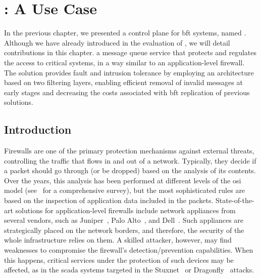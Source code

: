 \chapter{\sieveq: A Use Case}
\label{chap:sieveq}

In the previous chapter, we presented a control plane for \gls{bft} systems, named \system. 
Although we have already introduced \sieveq in the evaluation of \system, we will detail \sieveq contributions in this chapter.
\sieveq a message queue service that protects and regulates the access to critical systems, in a way similar to an application-level firewall.
The solution provides fault and intrusion tolerance by employing an architecture based on two filtering layers, enabling efficient removal of invalid messages at early stages and decreasing the costs associated with \gls{bft} replication of previous solutions.


\section{Introduction}

Firewalls are one of the primary protection mechanisms against external threats, controlling the traffic that flows in and out of a network. 
Typically, they decide if a packet should go through (or be dropped) based on the analysis of its contents. 
Over the years, this analysis has been performed at different levels of the \gls{osi} model (see~\cite{Keromytis:2006} for a comprehensive survey), but the most sophisticated rules are based on the inspection of application data included in the packets.
State-of-the-art solutions for application-level firewalls include network appliances from several vendors, such as Juniper~\cite{juniper}, Palo Alto~\cite{paloalto}, and Dell~\cite{sonicwall}.
Such appliances are strategically placed on the network borders, and therefore, the security of the whole infrastructure relies on them.
A skilled attacker, however, may find weaknesses to compromise the firewall's detection/prevention capabilities.
When this happens, critical services under the protection of such devices may be affected, as in the \gls{scada} systems targeted in the Stuxnet~\cite{stuxnet:2010} or Dragonfly~\cite{dragonfly:2014} attacks.


